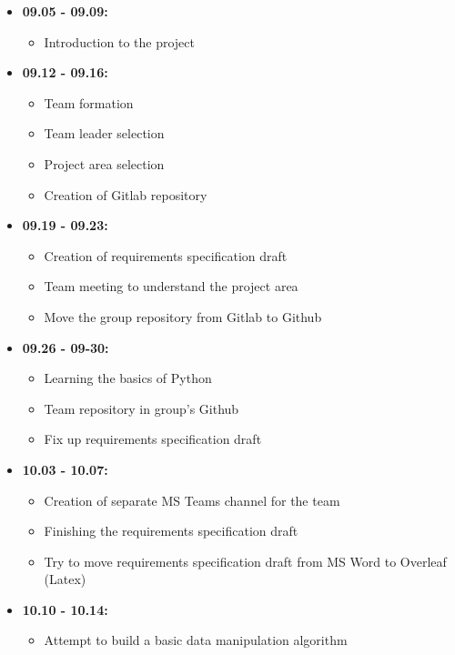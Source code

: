 \documentclass[a4paper,12pt,fleqn]{article}
\begin{document}
\begin{itemize}
    \item \textbf{09.05 - 09.09:}
    \begin{itemize}
        \item Introduction to the project
    \end{itemize}
    
    \item \textbf{09.12 - 09.16:}
    \begin{itemize}
        \item Team formation
        \item Team leader selection
        \item Project area selection
        \item Creation of Gitlab repository
    \end{itemize}
    
    \item \textbf{09.19 - 09.23:}
    \begin{itemize}
        \item Creation of requirements specification draft
        \item Team meeting to understand the project area
        \item Move the group repository from Gitlab to Github
    \end{itemize}
    
    \item \textbf{09.26 - 09-30:}
    \begin{itemize}
        \item Learning the basics of Python
        \item Team repository in group's Github
        \item Fix up requirements specification draft
    \end{itemize}
    
    \item \textbf{10.03 - 10.07:}
    \begin{itemize}
        \item Creation of separate MS Teams channel for the team
        \item Finishing the requirements specification draft
        \item Try to move requirements specification draft from MS Word to Overleaf (Latex)
    \end{itemize}
    
    \item \textbf{10.10 - 10.14:}
    \begin{itemize}
        \item Attempt to build a basic data manipulation algorithm
    \end{itemize}
    

\end{itemize}
\end{document}
